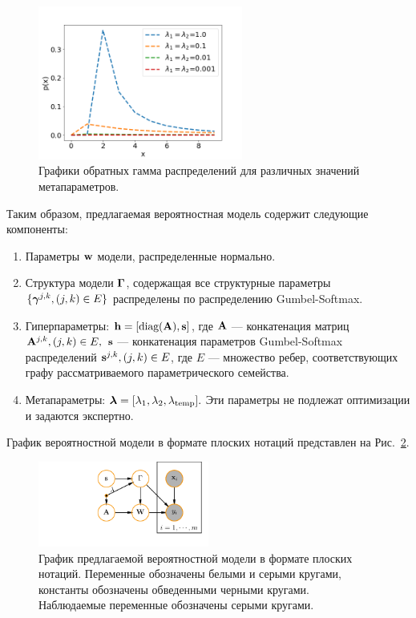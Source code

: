 \begin{figure}
\centering
\includegraphics[width=0.6\textwidth]{plots/notebooks/invgamma.png}
\caption{Графики обратных гамма распределений для различных значений метапараметров.}
\label{fig:inv-gamma}
\end{figure}


Таким образом, предлагаемая вероятностная модель содержит следующие компоненты:
\begin{enumerate}
\item Параметры $\mathbf{w}$ модели, распределенные нормально.
\item Структура модели $\boldsymbol{\Gamma}$, содержащая все структурные параметры $\{\boldsymbol{\gamma}^{j,k}, (j,k) \in E\}$ распределены по распределению Gumbel-Softmax.
\item Гиперпараметры: $\mathbf{h} = [\text{diag}(\mathbf{A}), \mathbf{s}]$, где $\mathbf{A}$ --- конкатенация матриц $\mathbf{A}^{j,k}, (j,k) \in E,$ $\mathbf{s}$ --- конкатенация параметров Gumbel-Softmax распределений $\mathbf{s}^{j,k}, (j,k) \in E$, где $E$ --- множество ребер, соответствующих графу рассматриваемого параметрического семейства.
\item Метапараметры: $\boldsymbol{\lambda} = [\lambda_1, \lambda_2, \lambda_{\text{temp}}].$ Эти параметры не подлежат оптимизации и задаются экспертно. 
\end{enumerate}

График вероятностной модели в формате плоских нотаций представлен на Рис.~\ref{fig:plate_prob}.
\begin{figure}
\centering
   \includegraphics[width=0.5\textwidth]{plots/notebooks/simple_plate.pdf}
\caption{График предлагаемой вероятностной модели в формате плоских нотаций. Переменные обозначены белыми и серыми кругами, константы обозначены обведенными черными кругами. Наблюдаемые переменные обозначены серыми кругами.}
\label{fig:plate_prob}
\end{figure}

